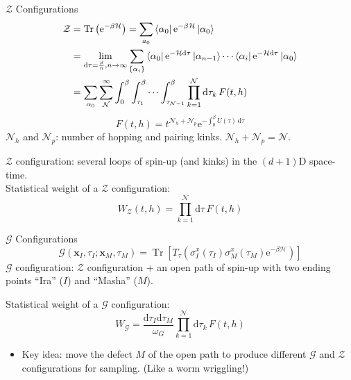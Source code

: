 \documentclass[aspectratio=43]{beamer}
\DeclareMathOperator{\Tr}{Tr}
\begin{document}
\begin{frame}{$\mathcal{Z}$ Configurations}
  \begin{align*}
    \mathcal{Z} &= \Tr \left(\mathrm{e}^{-\beta \mathcal{H}}\right) = \sum_{a_0}\bra{\alpha_0}\mathrm{e}^{-\beta \mathcal{H}}\ket{\alpha_0}\\
                &= \lim_{\mathrm{d}\tau = \frac{\beta}{n}, n \to \infty} \sum_{\{\alpha_i\}}\bra{\alpha_0}\mathrm{e}^{-\mathcal{H}\mathrm{d}\tau}\ket{\alpha_{n-1}}\cdots \bra{\alpha_i}\mathrm{e}^{-\mathcal{H}\mathrm{d}\tau}\ket{\alpha_0}\\
                &= \sum_{\alpha_0}\sum_{\mathcal{N}}^{\infty}\int_{0}^{\beta}\int_{\tau_1}^{\beta}\cdots \int_{\tau_{\mathcal{N}-1}}^{\beta} \prod_{k=1}^{\mathcal{N}}\mathrm{d}\tau_k\,F(t, h)
  \end{align*}
  \[
    F(t, h) = t^{\mathcal{N}_h+\mathcal{N}_p}\mathrm{e}^{-\int_{0}^{\beta}U(\tau)\,\mathrm{d}\tau}
  \]
  $\mathcal{N}_h$ and $\mathcal{N}_p$: number of hopping and pairing kinks. $\mathcal{N}_h + \mathcal{N}_p = \mathcal{N}$.

  $\mathcal{Z}$ configuration: several loops of spin-up (and kinks) in the $(d+1)$D space-time.\\
  Statistical weight of a $\mathcal{Z}$ configuration:
  \[
    W_{\mathcal{Z}}(t, h) = \prod_{k=1}^{\mathcal{N}}\mathrm{d}\tau\,F(t, h)
  \]
\end{frame}

\begin{frame}{$\mathcal{G}$ Configurations}
  \[
    \mathcal{G}(\bm{x}_I, \tau_I; \bm{x}_M, \tau_M) = \Tr\left[ T_\tau\left( \sigma_I^x(\tau_I)\sigma_M^x(\tau_M)\mathrm{e}^{-\beta\mathcal{H}} \right) \right]
  \]
  $\mathcal{G}$ configuration: $\mathcal{Z}$ configuration + an open path of spin-up with two ending points ``Ira'' ($I$) and ``Masha'' ($M$).

  Statistical weight of a $\mathcal{G}$ configuration:
  \[
    W_\mathcal{G} = \frac{\mathrm{d}\tau_I\mathrm{d}\tau_M}{\omega_G} \prod_{k=1}^{\mathcal{N}}\mathrm{d}\tau_k\,F(t, h)
  \]
  \begin{itemize}
    \item Key idea: move the defect $M$ of the open path to produce different $\mathcal{G}$ and $\mathcal{Z}$ configurations for sampling. (Like a worm wriggling!)
  \end{itemize}
\end{frame}
\end{document}

